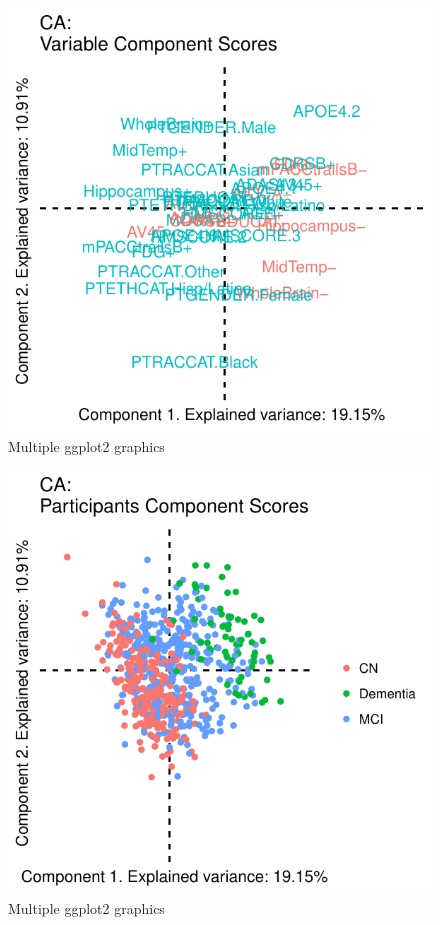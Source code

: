 \documentclass[]{article}
\begin{document}
\begin{figure}[H]

{\centering \includegraphics{1_b_Simple_RMarkdown_PDF_files/figure-latex/unnamed-chunk-2-1} 

}

\caption{Multiple ggplot2 graphics}\label{fig:unnamed-chunk-21}
\end{figure}
\begin{figure}[H]

{\centering \includegraphics{1_b_Simple_RMarkdown_PDF_files/figure-latex/unnamed-chunk-2-2} 

}

\caption{Multiple ggplot2 graphics}\label{fig:unnamed-chunk-22}
\end{figure}
\end{document}
